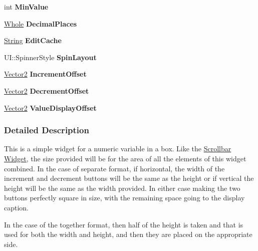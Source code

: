 \begin{DoxyCompactItemize}
\item 
\hypertarget{classphys_1_1UI_1_1Spinner_a615c7f96fd2267247a7537043d521a08}{
int {\bfseries MinValue}}
\label{classphys_1_1UI_1_1Spinner_a615c7f96fd2267247a7537043d521a08}

\item 
\hypertarget{classphys_1_1UI_1_1Spinner_a52fded30d32953017aebee4eaf11477a}{
\hyperlink{namespacephys_a460f6bc24c8dd347b05e0366ae34f34a}{Whole} {\bfseries DecimalPlaces}}
\label{classphys_1_1UI_1_1Spinner_a52fded30d32953017aebee4eaf11477a}

\item 
\hypertarget{classphys_1_1UI_1_1Spinner_a9d9d8a835f927a1ad747331f034cbcba}{
\hyperlink{namespacephys_aa03900411993de7fbfec4789bc1d392e}{String} {\bfseries EditCache}}
\label{classphys_1_1UI_1_1Spinner_a9d9d8a835f927a1ad747331f034cbcba}

\item 
\hypertarget{classphys_1_1UI_1_1Spinner_a9e46f97ce5d56a7595ee49071dcf29bc}{
UI::SpinnerStyle {\bfseries SpinLayout}}
\label{classphys_1_1UI_1_1Spinner_a9e46f97ce5d56a7595ee49071dcf29bc}

\item 
\hypertarget{classphys_1_1UI_1_1Spinner_ad023b770c4ef4fff72ebae0e5d29836a}{
\hyperlink{classphys_1_1Vector2}{Vector2} {\bfseries IncrementOffset}}
\label{classphys_1_1UI_1_1Spinner_ad023b770c4ef4fff72ebae0e5d29836a}

\item 
\hypertarget{classphys_1_1UI_1_1Spinner_aa8daf18f7da42d29bc12bd449a285a10}{
\hyperlink{classphys_1_1Vector2}{Vector2} {\bfseries DecrementOffset}}
\label{classphys_1_1UI_1_1Spinner_aa8daf18f7da42d29bc12bd449a285a10}

\item 
\hypertarget{classphys_1_1UI_1_1Spinner_a528269192dd2e2b85b31c8aa8b0552c8}{
\hyperlink{classphys_1_1Vector2}{Vector2} {\bfseries ValueDisplayOffset}}
\label{classphys_1_1UI_1_1Spinner_a528269192dd2e2b85b31c8aa8b0552c8}

\end{DoxyCompactItemize}


\subsubsection{Detailed Description}
This is a simple widget for a numeric variable in a box. Like the \hyperlink{classphys_1_1UI_1_1Scrollbar}{Scrollbar} \hyperlink{classphys_1_1UI_1_1Widget}{Widget}, the size provided will be for the area of all the elements of this widget combined. In the case of separate format, if horizontal, the width of the increment and decrement buttons will be the same as the height or if vertical the height will be the same as the width provided. In either case making the two buttons perfectly square in size, with the remaining space going to the display caption. \par
 In the case of the together format, then half of the height is taken and that is used for both the width and height, and then they are placed on the appropriate side. 

